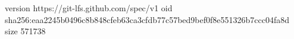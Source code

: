 version https://git-lfs.github.com/spec/v1
oid sha256:eaa2245b0496c8b848cfeb63ca3cfdb77c57bed9bef0f8e551326b7ccc04fa8d
size 571738
